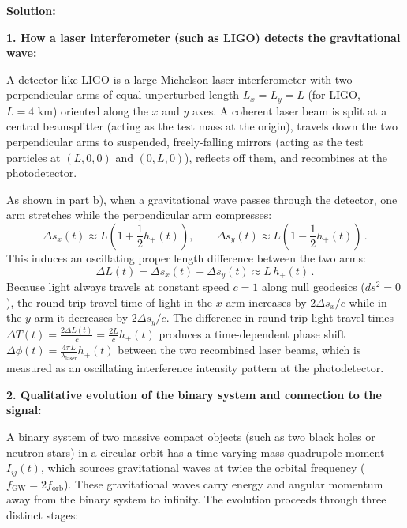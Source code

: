 \documentclass[12pt]{article}
\newcommand{\be}{\begin{equation}}
\newcommand{\ee}{\end{equation}}
\begin{document}
\begin{enumerate}[label=\alph*)]
\medskip
\noindent\textbf{Solution:}

\noindent\textbf{1. How a laser interferometer (such as LIGO) detects the gravitational wave:}

A detector like LIGO is a large Michelson laser interferometer with two perpendicular arms of equal unperturbed length $L_x = L_y = L$ (for LIGO, $L = 4\text{ km}$) oriented along the $x$ and $y$ axes. A coherent laser beam is split at a central beamsplitter (acting as the test mass at the origin), travels down the two perpendicular arms to suspended, freely-falling mirrors (acting as the test particles at $(L,0,0)$ and $(0,L,0)$), reflects off them, and recombines at the photodetector.

As shown in part b), when a gravitational wave passes through the detector, one arm stretches while the perpendicular arm compresses:
\be
\Delta s_x(t) \approx L \left(1 + \frac{1}{2} h_{+}(t)\right), \qquad \Delta s_y(t) \approx L \left(1 - \frac{1}{2} h_{+}(t)\right) \,.
\ee
This induces an oscillating proper length difference between the two arms:
\be
\Delta L(t) = \Delta s_x(t) - \Delta s_y(t) \approx L \, h_{+}(t) \,.
\ee
Because light always travels at constant speed $c = 1$ along null geodesics ($ds^2 = 0$), the round-trip travel time of light in the $x$-arm increases by $2\Delta s_x / c$ while in the $y$-arm it decreases by $2\Delta s_y / c$. The difference in round-trip light travel times $\Delta T(t) = \frac{2 \Delta L(t)}{c} = \frac{2L}{c} h_{+}(t)$ produces a time-dependent phase shift $\Delta \phi(t) = \frac{4\pi L}{\lambda_{\text{laser}}} h_{+}(t)$ between the two recombined laser beams, which is measured as an oscillating interference intensity pattern at the photodetector.

\medskip
\noindent\textbf{2. Qualitative evolution of the binary system and connection to the signal:}

A binary system of two massive compact objects (such as two black holes or neutron stars) in a circular orbit has a time-varying mass quadrupole moment $I_{ij}(t)$, which sources gravitational waves at twice the orbital frequency ($f_{\text{GW}} = 2 f_{\text{orb}}$). These gravitational waves carry energy and angular momentum away from the binary system to infinity. The evolution proceeds through three distinct stages:


\end{enumerate}
\end{document}
